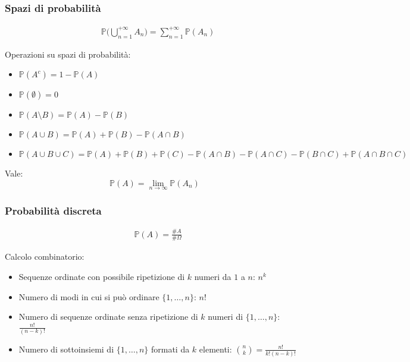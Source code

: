 \subsubsection{Spazi di probabilità}
\begin{align}
	& \mathbb{P}\bigg(\bigcup_{n=1}^{+\infty}A_n\bigg) = \sum_{n=1}^{+\infty} \mathbb{P}(A_n) \tag{$\sigma$-addittività}
\end{align}
\begin{proposition}
	Operazioni su spazi di probabilità:
	\begin{itemize}
		\item $\mathbb{P}(A^c) = 1-\mathbb{P}(A)$
		\item $\mathbb{P}(\emptyset) = 0$
		\item $\mathbb{P}(A \setminus B) = \mathbb{P}(A)-\mathbb{P}(B)$
		\item $\mathbb{P}(A \cup B) = \mathbb{P}(A) + \mathbb{P}(B) - \mathbb{P}(A \cap B)$
		\item $\mathbb{P}(A \cup B \cup C) = \mathbb{P}(A) + \mathbb{P}(B) + \mathbb{P}(C) - \mathbb{P}(A \cap B) - \mathbb{P}(A \cap C) - \mathbb{P}(B \cap C) + \mathbb{P}(A \cap B \cap C)$
	\end{itemize}
\end{proposition}

\begin{proposition}
	Vale:
	\begin{equation}
		\mathbb{P}(A) = \lim_{n \to \infty} \mathbb{P}(A_n)
	\end{equation}
\end{proposition}

\subsubsection{Probabilità discreta}
\begin{align}
	& \mathbb{P}(A) = \frac{\# A}{\# \Omega} \tag{Probabilità}
\end{align}
\begin{proposition}
	Calcolo combinatorio:
	\begin{itemize}
		\item Sequenze ordinate con possibile ripetizione di $k$ numeri da $1$ a $n$: $n^k$
		\item Numero di modi in cui si può ordinare $\{1, \ldots, n\}$: $n!$
		\item Numero di sequenze ordinate senza ripetizione di $k$ numeri di $\{1, \ldots, n\}$: $\frac{n!}{(n-k)!}$
		\item Numero di sottoinsiemi di $\{1, \ldots, n\}$ formati da $k$ elementi: $\binom{n}{k} = \frac{n!}{k!(n-k)!}$
	\end{itemize}
\end{proposition}

